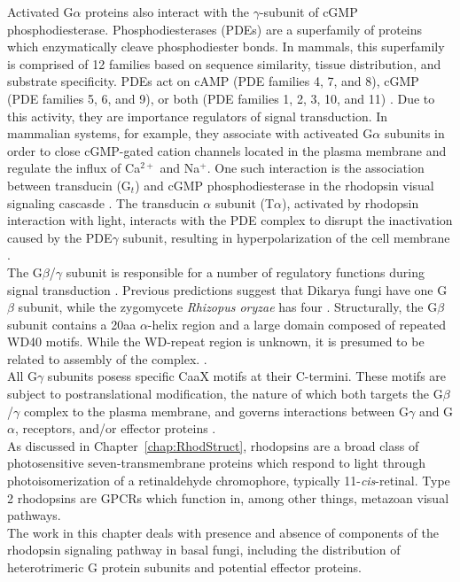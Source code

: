 \indent Activated G$\alpha$ proteins also interact with the $\gamma$-subunit of cGMP phosphodiesterase. Phosphodiesterases (PDEs) are a superfamily of proteins which enzymatically cleave phosphodiester bonds. In mammals, this superfamily is comprised of 12 families based on sequence similarity, tissue distribution, and substrate specificity. PDEs act on cAMP (PDE families 4, 7, and 8), cGMP (PDE families 5, 6, and 9), or both (PDE families 1, 2, 3, 10, and 11) \cite{Conti2000}. Due to this activity, they are importance regulators of signal transduction. In mammalian systems, for example, they associate with activeated G$\alpha$ subunits in order to close cGMP-gated cation channels located in the plasma membrane and regulate the influx of Ca$^{2+}$ and Na$^{+}$. One such interaction is the association between transducin (G$_{t}$) and cGMP phosphodiesterase in the rhodopsin visual signaling cascasde \cite{Deterre1988}. The transducin $\alpha$ subunit (T$\alpha$), activated by rhodopsin interaction with light, interacts with the PDE complex to disrupt the inactivation caused by the PDE$\gamma$ subunit, resulting in hyperpolarization of the cell membrane \cite{Deterre1988}.\\
\indent The G$\beta$/$\gamma$ subunit is responsible for a number of regulatory functions during signal transduction \cite{Clapham1997}. Previous predictions suggest that Dikarya fungi have one G$\beta$ subunit, while the zygomycete \textit{Rhizopus oryzae} has four \cite{Li2007}. Structurally, the G$\beta$ subunit contains a 20aa $\alpha$-helix region and a large domain composed of repeated WD40 motifs. While the WD-repeat region is unknown, it is presumed to be related to assembly of the complex. \cite{Clapham1997}.\\
\indent All G$\gamma$ subunits posess specific CaaX motifs at their C-termini. These motifs are subject to 
postranslational modification, the nature of which both targets the G$\beta$/$\gamma$ complex to 
the plasma membrane, and governs interactions between G$\gamma$ and G$\alpha$, receptors, and/or 
effector proteins \cite{Krystofova2005}.\\
\indent As discussed in Chapter~\ref{chap:RhodStruct}, rhodopsins are a broad class of photosensitive 
seven-transmembrane proteins which respond to light through photoisomerization of a retinaldehyde chromophore, 
typically 11-\textit{cis}-retinal. Type 2 rhodopsins are GPCRs which function in, among other things, metazoan visual pathways.\\
\indent The work in this chapter deals with presence and absence of components of the 
rhodopsin signaling pathway in basal fungi, including the distribution of heterotrimeric 
G protein subunits and potential effector proteins.\\

